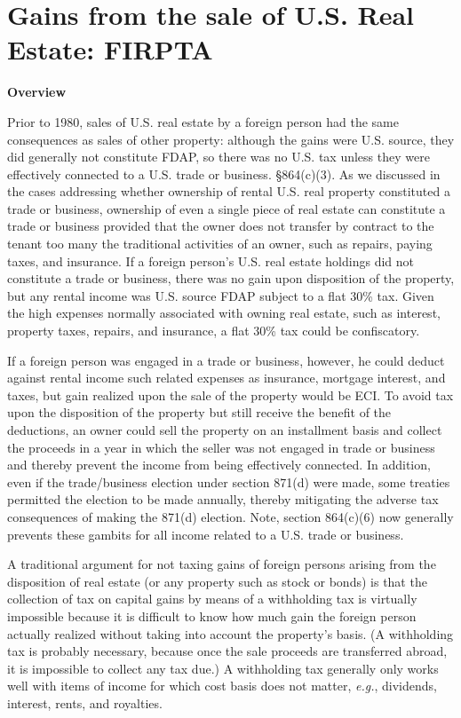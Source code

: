 \chapter{Gains from the sale of U.S. Real Estate:  FIRPTA}

\begin{center}
\textbf{Overview}
\end{center}

Prior to 1980, sales of U.S. real estate by a foreign person had the same consequences as sales of other property:  although the gains were U.S. source, they did generally not constitute FDAP, so there was no U.S. tax unless they were effectively connected to a U.S. trade or business.  \S 864(c)(3).  As we discussed in the cases addressing whether ownership of rental U.S. real property constituted a trade or business, ownership of even a single piece of real estate can constitute a trade or business provided that the owner does not transfer by contract to the tenant too many the traditional activities of an owner, such as repairs, paying taxes, and insurance.  If a foreign person's U.S. real estate holdings did not constitute a trade or business, there was no gain upon disposition of the property, but any rental income was U.S. source FDAP subject to a flat 30\% tax.  Given the high expenses  normally associated with owning real estate, such as interest, property taxes, repairs, and insurance, a flat 30\% tax could be confiscatory.  

If a foreign person was engaged in a trade or business, however, he could deduct against rental income such related expenses as insurance, mortgage interest, and taxes, but gain realized upon the sale of the property would be ECI.  To avoid tax upon the disposition of the property but still receive the benefit of the deductions, an owner could sell the property on an installment basis and collect the proceeds in a year in which the seller was not engaged in trade or business and thereby prevent the income from being effectively connected.  In addition, even if the trade/business election under section 871(d) were made, some treaties permitted the election to be made annually, thereby mitigating the adverse tax consequences of making the 871(d) election.  Note, section 864(c)(6) now generally prevents these gambits for all income related to a U.S. trade or business. 

A traditional argument for not taxing gains of foreign persons arising from the disposition of real estate (or any property such as stock or bonds) is that the collection of tax on capital gains by means of a withholding tax is virtually impossible because  it is difficult to know how much gain the foreign person actually realized without taking into account the property's basis.  (A withholding tax is probably necessary, because once the sale proceeds are transferred abroad, it is impossible to collect any tax due.)  A withholding tax generally only works well with items of income for which cost basis does not matter, \emph{e.g.}, dividends, interest, rents, and royalties.

